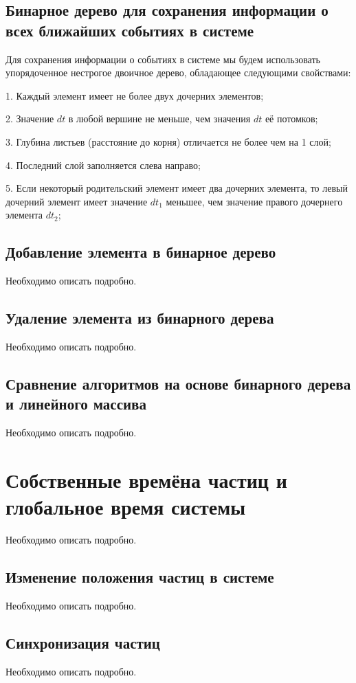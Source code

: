 \documentclass[a4paper]{article}
\begin{document}
\subsection{Бинарное дерево для сохранения информации о всех ближайших событиях в системе}

Для сохранения информации о событиях в системе мы будем использовать упорядоченное нестрогое двоичное дерево, обладающее следующими свойствами:

1. Каждый элемент имеет не более двух дочерних элементов;

2. Значение $ dt $ в любой вершине не меньше, чем значения $ dt $ её потомков;

3. Глубина листьев (расстояние до корня) отличается не более чем на 1 слой;

4. Последний слой заполняется слева направо;

5. Если некоторый родительский элемент имеет два дочерних элемента, то левый дочерний элемент имеет значение $ dt_1 $ меньшее, чем значение правого дочернего элемента $ dt_2 $;



\subsection{Добавление элемента в бинарное дерево}
Необходимо описать подробно.
\subsection{Удаление элемента из бинарного дерева}
Необходимо описать подробно.
\subsection{Сравнение алгоритмов на основе бинарного дерева и линейного массива}
Необходимо описать подробно.



\newpage
\section{Собственные времёна частиц и глобальное время системы}
Необходимо описать подробно.

\subsection{Изменение положения частиц в системе}
Необходимо описать подробно.

\subsection{Синхронизация частиц}
Необходимо описать подробно.
\end{document}
